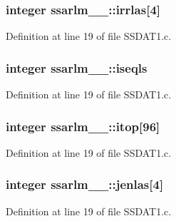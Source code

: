 \subsubsection[{\texorpdfstring{irrlas}{irrlas}}]{\setlength{\rightskip}{0pt plus 5cm}integer ssarlm\+\_\+\_\+\+::irrlas\mbox{[}4\mbox{]}}\hypertarget{structssarlm__1___a6828214b1a29c2fe9dd1aca1e16bc160}{}\label{structssarlm__1___a6828214b1a29c2fe9dd1aca1e16bc160}


Definition at line 19 of file S\+S\+D\+A\+T1.\+c.

\subsubsection[{\texorpdfstring{iseqls}{iseqls}}]{\setlength{\rightskip}{0pt plus 5cm}integer ssarlm\+\_\+\_\+\+::iseqls}\hypertarget{structssarlm__1___a190c86858cc921d83daba5643d2f421b}{}\label{structssarlm__1___a190c86858cc921d83daba5643d2f421b}


Definition at line 19 of file S\+S\+D\+A\+T1.\+c.

\subsubsection[{\texorpdfstring{itop}{itop}}]{\setlength{\rightskip}{0pt plus 5cm}integer ssarlm\+\_\+\_\+\+::itop\mbox{[}96\mbox{]}}\hypertarget{structssarlm__1___ac3a333b128d56af085fd862ffc7332f7}{}\label{structssarlm__1___ac3a333b128d56af085fd862ffc7332f7}


Definition at line 19 of file S\+S\+D\+A\+T1.\+c.

\subsubsection[{\texorpdfstring{jenlas}{jenlas}}]{\setlength{\rightskip}{0pt plus 5cm}integer ssarlm\+\_\+\_\+\+::jenlas\mbox{[}4\mbox{]}}\hypertarget{structssarlm__1___aea0c0786b21332d5cd8f09a995cd0019}{}\label{structssarlm__1___aea0c0786b21332d5cd8f09a995cd0019}


Definition at line 19 of file S\+S\+D\+A\+T1.\+c.


